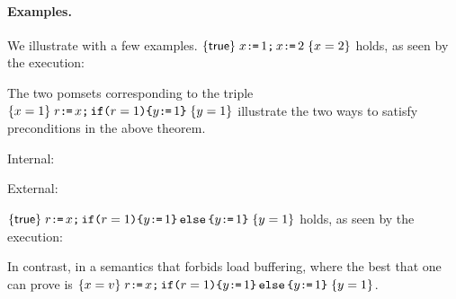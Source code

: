 

\paragraph*{Examples.}
We illustrate with a few examples.
$\hoare{\TRUE}{x\GETS 1 \SEMI x \GETS 2}{x=2} $ holds, as seen by the execution:
\begin{tikzdisplay}[node distance=1em]
\end{tikzdisplay}

The two pomsets corresponding to the triple $\hoare{x=1}{r \GETS x \SEMI \IF{r=1} \THEN y \GETS 1\FI}{y=1}$ illustrate the two ways to satisfy preconditions in the above theorem.
\begin{displaymathsmall}
\mbox{Internal: }
\begin{tikzcenter}
\end{tikzcenter}
\qquad \qquad
\mbox{External: }
\begin{tikzcenter}
\end{tikzcenter}
\end{displaymathsmall}

$\hoare{\TRUE}{r \GETS x \SEMI \IF{r=1} \THEN y \GETS 1 \ELSE y \GETS 1 \FI}{y=1} $ holds, as seen by the execution:
\begin{tikzdisplay}[node distance=1em]
\end{tikzdisplay}
In contrast, in a semantics that forbids load buffering, where the best that one can prove is
$\hoare{x=v} {r \GETS x \SEMI \IF{r=1} \THEN y \GETS 1 \ELSE y \GETS 1 \FI}{y= 1}
$.

